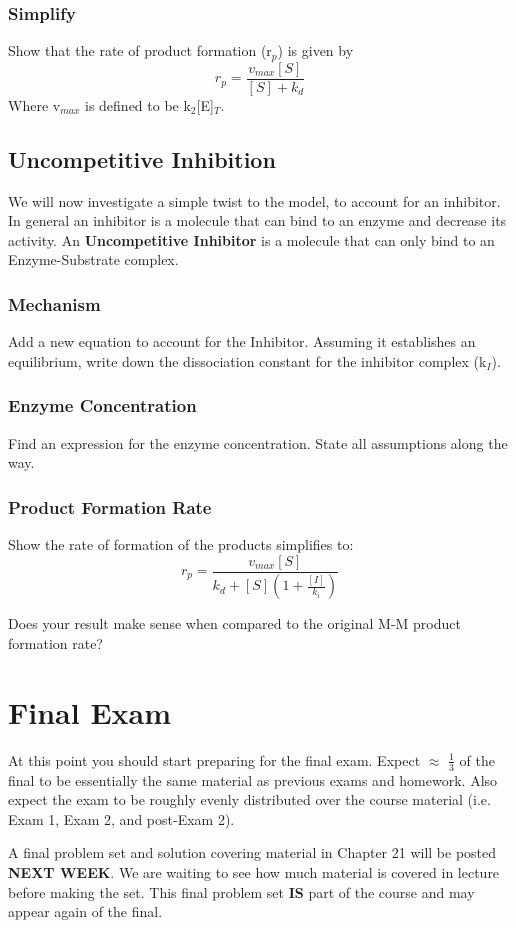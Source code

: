 \documentclass{article}
\newcommand{\be}{\begin{equation}}
\newcommand{\ee}{\end{equation}}
\begin{document}
\subsubsection{Simplify}
Show that the rate of product formation (r$_p$) is given by 
\be
r_p = \frac{v_{max}[S]}{[S] + k_d}
\ee
Where v$_{max}$ is defined to be k$_2$[E]$_T$. 

\subsection{Uncompetitive Inhibition}
We will now investigate a simple twist to the model, to account for an inhibitor.
In general an inhibitor is a molecule that can bind to an enzyme and decrease its activity. 
An \textbf{Uncompetitive Inhibitor}  is a molecule that can only bind to an Enzyme-Substrate complex. 

\subsubsection{Mechanism}
Add a new equation to account for the Inhibitor.
Assuming it establishes an equilibrium, write down the dissociation constant for the inhibitor complex (k$_I$). 

\subsubsection{Enzyme Concentration}
Find an expression for the enzyme concentration.
State all assumptions along the way. 

\subsubsection{Product Formation Rate}
Show the rate of formation of the products simplifies to:
\be
r_p = \frac{v_{max}[S]}{k_d + [S]\left(1+\frac{[I]}{k_i}\right)}
\ee

Does your result make sense when compared to the original M-M product formation rate?

\section{Final Exam}
At this point you should start preparing for the final exam.
Expect $\approx$ $\frac{1}{3}$ of the final to be essentially the same material as previous exams and homework. 
Also expect the exam to be roughly evenly distributed over the course material (i.e. Exam 1, Exam  2, and post-Exam 2). 

A final problem set and solution covering  material in Chapter 21 will be  posted \textbf{NEXT WEEK}. 
We are waiting  to see how much material is covered in lecture before making the set. 
This final problem  set \textbf{IS} part of the course and may appear again of the final. 
\end{document}
